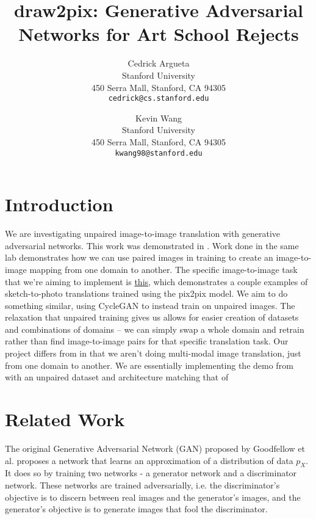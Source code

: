 \documentclass[10pt,twocolumn,letterpaper]{article}
\begin{document}
\title{draw2pix: Generative Adversarial Networks for Art School Rejects}

\author{Cedrick Argueta\\
Stanford University\\
450 Serra Mall, Stanford, CA 94305\\
{\tt\small cedrick@cs.stanford.edu}
\and
Kevin Wang\\
Stanford University\\
450 Serra Mall, Stanford, CA 94305\\
{\tt\small kwang98@stanford.edu}
}

\maketitle

\section{Introduction}
We are investigating unpaired image-to-image translation with generative adversarial networks.
This work was demonstrated in \cite{cycleGAN}.
Work done in the same lab \cite{pix2pix} demonstrates how we can use paired images in training to create an image-to-image mapping from one domain to another.
The specific image-to-image task that we're aiming to implement is \href{https://affinelayer.com/pixsrv/}{this}, which demonstrates a couple examples of sketch-to-photo translations trained using the pix2pix model.
We aim to do something similar, using CycleGAN to instead train on unpaired images.
The relaxation that unpaired training gives us allows for easier creation of datasets and combinations of domains -- we can simply swap a whole domain and retrain rather than find image-to-image pairs for that specific translation task.
Our project differs from \cite{bicyclegan} in that we aren't doing multi-modal image translation, just from one domain to another. 
We are essentially implementing the demo from \cite{pix2pix} with an unpaired dataset and architecture matching that of \cite{cycleGAN}

\section{Related Work}
The original Generative Adversarial Network (GAN) proposed by Goodfellow et al. \cite{gan}  proposes a network that learns an approximation of a distribution of data $p_{X}$.
It does so by training two networks - a generator network and a discriminator network.
These networks are trained adversarially, i.e. the discriminator's objective is to discern between real images and the generator's images, and the generator's objective is to generate images that fool the discriminator.
\end{document}
